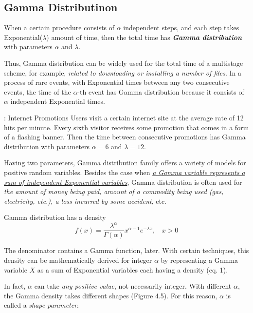\subsection{Gamma Distributinon}

When a certain procedure consists of $\alpha$ independent steps, and each step takes Exponential($\lambda$) amount of time, then the total time has \textit{\textbf{Gamma distribution}} with parameters $\alpha$ and $\lambda$.

Thus, Gamma distribution can be widely used for the total time of a multistage scheme, for example, \textit{related to downloading or installing a number of files}. In a process of rare events, with Exponential times between any two consecutive events, the time of the $\alpha$-th event has Gamma distribution because it consists of $\alpha$ independent Exponential times.

\begin{example}{: Internet Promotions}
    Users visit a certain internet site at the average rate of 12 hits per minute. Every sixth visitor receives some promotion that comes in a form of a flashing banner. Then the time between consecutive promotions has Gamma distribution with parameters $\alpha = 6$ and $\lambda = 12$. 
\end{example}

Having two parameters, Gamma distribution family offers a variety of models for positive random variables. Besides the case when \underline{\textit{a Gamma variable represents a sum of independent Exponential variables}}, Gamma distribution is often used for \textit{the amount of money being paid, amount of a commodity being used (gas, electricity, etc.), a loss incurred by some accident}, etc.

Gamma distribution has a density
\begin{equation}
    f(x) = \frac{\lambda^{\alpha}}{\Gamma(\alpha)} x^{\alpha-1}e^{-\lambda x},\ \ \ \ x > 0
\end{equation}

The denominator contains a Gamma function, later. With certain techniques, this density can be mathematically derived for integer $\alpha$ by representing a Gamma variable $X$ as a sum of Exponential variables each having a density (eq. 1).

In fact, $\alpha$ can take \textit{any positive value}, not necessarily integer. With different $\alpha$, the Gamma density takes different shapes (Figure 4.5). For this reason, $\alpha$ is called a \textit{shape parameter}.

